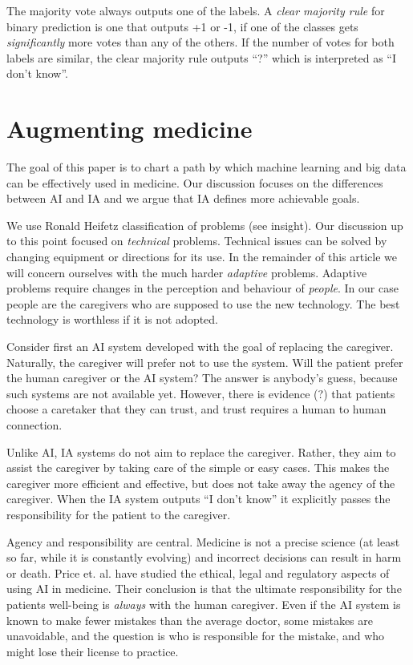 \documentclass[11pt]{pnas-new}
\begin{document}
The majority vote always outputs one of the labels. A {\em clear
  majority rule} for binary prediction is one that outputs +1 or -1,
if one of the classes gets {\em significantly} more votes than any of
the others. If the number of votes for both labels are similar, the
clear majority rule {\color{red}{\em shall}} outputs ``?'' which is interpreted as ``I don't
know''.


\section{Augmenting medicine}


The goal of this paper is to chart a path by which machine learning
and big data can be effectively used in medicine. Our discussion
focuses on the differences between AI and IA and we argue that IA
defines more achievable goals.

We use Ronald Heifetz classification of problems (see insight). Our
discussion up to this point focused on {\em technical}
problems. Technical issues can be solved by changing equipment or
directions for its use. In the remainder of this article we will
concern ourselves with the much harder {\em adaptive}
problems. Adaptive problems require changes in the perception and
behaviour of {\em people}. In our case people are the caregivers who
are supposed to use the new technology. The best technology is
worthless if it is not adopted.

Consider first an AI system developed with the goal of replacing the
caregiver. Naturally, the caregiver will prefer not to use the
system. Will the patient prefer the human caregiver or the AI system?
The answer is anybody's guess, because such systems are not available
yet. However, there is evidence (?) that patients choose a caretaker
that they can trust, and trust requires a human to human connection. 

Unlike AI, IA systems do not aim to replace the caregiver. Rather,
they aim to assist the caregiver by taking care of the simple or easy
cases. This makes the caregiver more efficient and effective, but does
not take away the agency of the caregiver. When the IA system outputs
``I don't know'' it explicitly passes the responsibility for the
patient to the caregiver.

Agency and responsibility are central. Medicine is not a precise
science {\color{red}(at least so far, while it is constantly evolving)} and incorrect decisions can result in harm or death.
Price et. al. have studied the ethical, legal and regulatory
aspects of using AI in medicine.\cite{price2014black,ford2016privacy, ford2017regulating}
Their conclusion is that the ultimate responsibility for the patients
well-being is {\em always} with the human caregiver. Even if the AI
system is known to make fewer mistakes than the average doctor, some
mistakes are unavoidable, and the question is who is responsible for
the mistake, and who might lose their license to practice.
\end{document}
